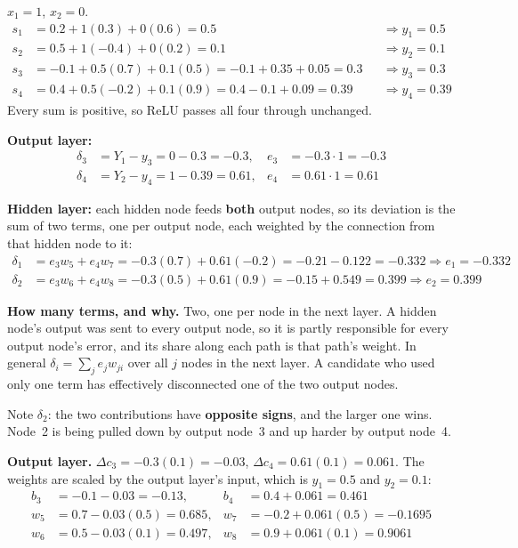 $x_1 = 1$, $x_2 = 0$.
\begin{align*}
  s_1 &= 0.2 + 1(0.3) + 0(0.6) = 0.5 &&\Rightarrow y_1 = \mathbf{0.5} \\
  s_2 &= 0.5 + 1(-0.4) + 0(0.2) = 0.1 &&\Rightarrow y_2 = \mathbf{0.1} \\
  s_3 &= -0.1 + 0.5(0.7) + 0.1(0.5) = -0.1 + 0.35 + 0.05 = 0.3 &&\Rightarrow y_3 = \mathbf{0.3} \\
  s_4 &= 0.4 + 0.5(-0.2) + 0.1(0.9) = 0.4 - 0.1 + 0.09 = 0.39 &&\Rightarrow y_4 = \mathbf{0.39}
\end{align*}
Every sum is positive, so ReLU passes all four through unchanged. 

\textbf{Output layer:}
\begin{align*}
  \delta_3 &= Y_1 - y_3 = 0 - 0.3 = -0.3, & e_3 &= -0.3 \cdot 1 = \mathbf{-0.3} \\
  \delta_4 &= Y_2 - y_4 = 1 - 0.39 = 0.61, & e_4 &= 0.61 \cdot 1 = \mathbf{0.61}
\end{align*}

\textbf{Hidden layer:} each hidden node feeds \textbf{both} output nodes, so its deviation is the
sum of two terms, one per output node, each weighted by the connection from that hidden node to it:
\begin{align*}
  \delta_1 &= e_3 w_5 + e_4 w_7 = -0.3(0.7) + 0.61(-0.2) = -0.21 - 0.122 = -0.332
    \Rightarrow e_1 = \mathbf{-0.332} \\
  \delta_2 &= e_3 w_6 + e_4 w_8 = -0.3(0.5) + 0.61(0.9) = -0.15 + 0.549 = 0.399
    \Rightarrow e_2 = \mathbf{0.399}
\end{align*}

\textbf{How many terms, and why.} Two, one per node in the next layer. A hidden node's output was
sent to every output node, so it is partly responsible for every output node's error, and its share
along each path is that path's weight. In general $\delta_i = \sum_j e_j w_{ji}$ over all $j$ nodes
in the next layer. A candidate who used only one term has effectively disconnected one of the two
output nodes.

Note $\delta_2$: the two contributions have \textbf{opposite signs}, and the larger one wins.
Node~2 is being pulled down by output node~3 and up harder by output node~4.

\textbf{Output layer.} $\Delta c_3 = -0.3(0.1) = -0.03$, $\Delta c_4 = 0.61(0.1) = 0.061$. The
weights are scaled by the output layer's input, which is $y_1 = 0.5$ and $y_2 = 0.1$:
\begin{align*}
  b_3 &= -0.1 - 0.03 = \mathbf{-0.13}, & b_4 &= 0.4 + 0.061 = \mathbf{0.461} \\
  w_5 &= 0.7 - 0.03(0.5) = \mathbf{0.685}, & w_7 &= -0.2 + 0.061(0.5) = \mathbf{-0.1695} \\
  w_6 &= 0.5 - 0.03(0.1) = \mathbf{0.497}, & w_8 &= 0.9 + 0.061(0.1) = \mathbf{0.9061}
\end{align*}

